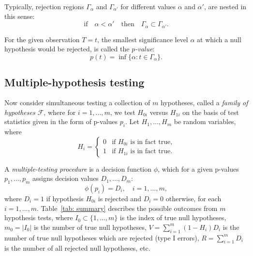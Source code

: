 \documentclass[10pt]{article}
\begin{document}
Typically, rejection regions $\Gamma_{\alpha}$ and $\Gamma_{\alpha'}$ for different values $\alpha$ and $\alpha'$, are nested in this sense:
\begin{equation} \label{eq: nesting}
	\text{if} \quad \alpha < \alpha' \quad \text{then} \quad \Gamma_{\alpha} \subset \Gamma_{\alpha'}.
\end{equation}


For the given observation $T = t$, the smallest significance level $\alpha$ at which a null hypothesis would be rejected, is called the {\it $p$-value}:
\begin{equation}
	p(t) = \inf \lbrace \alpha : t \in \Gamma_{\alpha} \rbrace.
\end{equation}


\subsection{Multiple-hypothesis testing}
Now consider simultaneous testing a collection of $m$ hypotheses, called a {\it family of hypotheses $\mathcal{F}$}, where for $i = 1, ..., m$, we test $H_{0i}$ versus $H_{1i}$ on the basis of test statistics given in the form of p-values $p_{i}$. Let $H_{1}, ...,H_{m}$ be random variables, where 
\[
	H_{i} = \begin{cases}
		0 & \text{if $H_{0i}$ is in fact true,}\\
		1 & \text{if $H_{1i}$ is in fact true.}
	\end{cases}
\]

A {\it multiple-testing procedure} is a decision function $\phi$, which for a given p-values $p_{1}, ..., p_{m}$ assigns decision values $D_{1}, ..., D_{m}$: 
\begin{equation}
\phi(p_{i}) = D_{i}, \quad i = 1,..., m,
\end{equation}
where $D_{i} = 1$ if hypothesis $H_{0i}$ is rejected and $D_{i} = 0$ otherwise, for each $i = 1,..., m$. Table~\ref{tab: summary} describes the possible outcomes from $m$ hypothesis tests, where $I_{0} \subset \lbrace 1, ..., m \rbrace$ is the index of true null hypotheses, $m_{0} = |I_{0}|$ is the number of true null hypotheses, $V = \sum_{i=1}^{m} (1 - H_{i}) D_{i}$ is the number of true null hypotheses which are rejected (type I errors), $R = \sum_{i=1}^{m} D_{i}$ is the number of all rejected null hypotheses, etc. 
\end{document}
